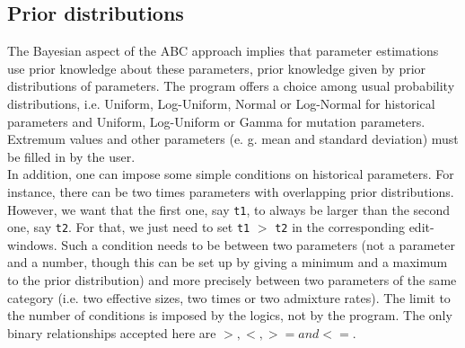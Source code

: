 \subsection{Prior distributions}
The Bayesian aspect of the ABC approach implies that parameter
estimations use prior knowledge about these parameters, prior knowledge given by prior distributions of parameters. The program
offers a choice among usual probability distributions, i.e.
Uniform, Log-Uniform, Normal or Log-Normal for historical parameters and Uniform, Log-Uniform or Gamma
 for mutation parameters. Extremum values and other parameters (e. g. mean and
standard deviation) must be filled in by the
user.  \\
In addition, one can impose some simple conditions on historical
parameters. For instance, there can be two times parameters with
overlapping prior distributions. However, we want that the first
one, say \texttt{t1}, to always be larger than the second one, say
\texttt{t2}. For that, we just need to set \texttt{t1} $>$
\texttt{t2} in the corresponding edit-windows. Such a condition
needs to be between two parameters (not a parameter and a number,
though this can be set up by giving a minimum and a maximum to the
prior distribution) and more precisely between two parameters of the same category (i.e. two effective sizes, two times or two admixture rates). The limit to the number of conditions is
imposed by the logics, not by the program. The only binary
relationships accepted here are $>, <, >= and <=$.

